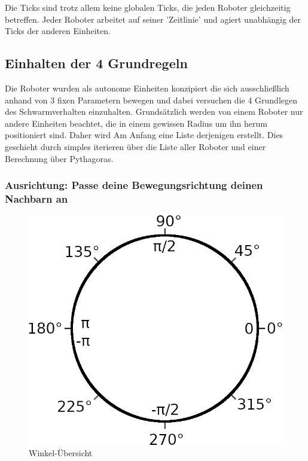 Die Ticks sind trotz allem keine globalen Ticks, die jeden Roboter gleichzeitig betreffen. Jeder Roboter arbeitet auf seiner 'Zeitlinie' und agiert unabhängig der Ticks der anderen Einheiten.

\subsection*{Einhalten der 4 Grundregeln}
Die Roboter wurden als autonome Einheiten konzipiert die sich ausschließlich anhand von 3 fixen Parametern bewegen und dabei versuchen die 4 Grundlegen des Schwarmverhalten einzuhalten. Grundsätzlich werden von einem Roboter nur andere Einheiten beachtet, die in einem gewissen Radius um ihn herum positioniert sind. Daher wird Am Anfang eine Liste derjenigen erstellt. Dies geschieht durch simples iterieren über die Liste aller Roboter und einer Berechnung über Pythagoras.

\subsubsection*{Ausrichtung: Passe deine Bewegungsrichtung deinen Nachbarn an}

\begin{figure}
	\includegraphics[width=\pictureWidthSmall,keepaspectratio]{graphics/WinkelTemplate.png}
	\caption{Winkel-Übersicht}
	\label{pic:WinkelUebersicht}
\end{figure}

